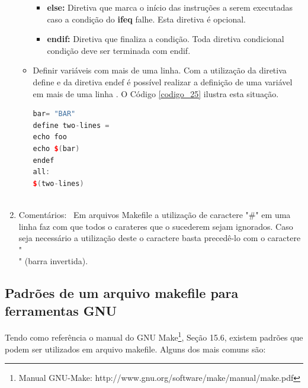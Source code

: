 \begin{enumerate}
\begin{itemize}
\begin{itemize}
        \item \textbf{else:} Diretiva que marca o início das instruções a serem 
    executadas caso a condição do \textbf{ifeq} falhe. Esta diretiva é opcional\cite{ref50}.

        \item \textbf{endif:} Diretiva que finaliza a condição. 
    Toda diretiva condicional condição deve ser terminada com endif\cite{ref50}.
    \end{itemize}

    \item Definir variáveis com mais de uma linha. Com a utilização da diretiva define
 e  da diretiva endef é possível realizar a definição de uma variável em mais
 de uma linha \cite{ref51}. O Código \ref{codigo_25} ilustra esta situação.

    \begin{lstlisting}[language=C++,frame=single,title={Código 25: 
                    Exemplo Make file com definição de variavel em
                                                  multiplas linhas},
                                                    label=codigo_25]
bar= "BAR"
define two-lines =
echo foo
echo $(bar)
endef
all:
$(two-lines)
    
    \end{lstlisting}


    \end{itemize}

    \item Comentários: \
Em arquivos Makefile a utilização de caractere "\#" em uma linha faz com
 que todos o carateres que o sucederem sejam ignorados. Caso seja necessário
 a utilização deste o caractere basta precedê-lo com o caractere "\\" 
(barra invertida)\cite{ref48}.

\end{enumerate}


\subsection{Padrões de um arquivo makefile para ferramentas GNU}

    
Tendo como referência o manual do GNU Make\footnote{
    Manual GNU-Make: http://www.gnu.org/software/make/manual/make.pdf 
}, Seção 15.6, existem padrões que podem ser utilizados em arquivo
 makefile. Alguns dos mais comuns são:

